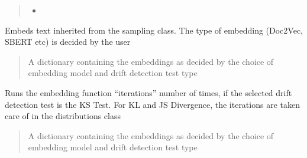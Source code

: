 \documentclass[letterpaper,10pt,english]{sphinxmanual}
\begin{document}
\begin{fulllineitems}
\begin{fulllineitems}
\begin{quote}
\begin{description}
\begin{itemize}
\item {} 
\sphinxAtStartPar
{}

\end{itemize}


\end{description}\end{quote}

\end{fulllineitems}


\begin{fulllineitems}
\label{\detokenize{fldModules/embedding:embedding.embedding.embed_data}}
\pysigstartsignatures
{}
\pysigstopsignatures
\sphinxAtStartPar
Embeds text inherited from the sampling class. The type of embedding (Doc2Vec, SBERT etc) is
decided by the user
\begin{quote}\begin{description}
\sphinxAtStartPar
A dictionary containing the embeddings as decided by the choice of embedding model and drift detection test type

\end{description}\end{quote}

\end{fulllineitems}


\begin{fulllineitems}
\label{\detokenize{fldModules/embedding:embedding.embedding.embed_data_iters}}
\pysigstartsignatures
{}
\pysigstopsignatures
\sphinxAtStartPar
Runs the embedding function “iterations” number of times, if the selected drift detection test
is the KS Test. For KL and JS Divergence, the iterations are taken care of in the distributions
class
\begin{quote}\begin{description}
\sphinxAtStartPar
A dictionary containing the embeddings as decided by the choice of embedding model and drift detection test type

\end{description}\end{quote}


\end{fulllineitems}
\end{fulllineitems}
\end{document}
